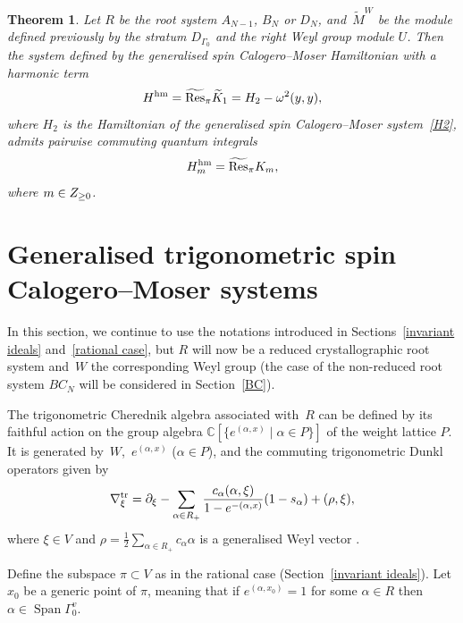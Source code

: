 \documentclass[12pt]{amsart}
\newcommand{\C}{\mathbb C}
\newcommand{\Z}{\mathbb Z}
\DeclareMathOperator{\Span}{Span}
\numberwithin{equation}{section}
\newtheorem{theorem}{Theorem}[section]
\theoremstyle{definition}
\begin{document}
\begin{theorem}
    Let $R$ be the root system $A_{N - 1}$, $B_N$ or $D_N$, and~$\widetilde{M}^W$ be the 
    module defined previously by the stratum $D_{\Gamma_0}$ and the right Weyl group 
    module $U$. Then the system defined by the generalised spin Calogero--Moser 
    Hamiltonian with a harmonic term 
    \begin{equation*}
        H^{\rm hm} =\widetilde{\mathrm{Res}}_{\pi}\widetilde{K}_1 = H_2 - \omega^2 (y , y) ,
    \end{equation*}
    where $H_2$ is the Hamiltonian of the generalised spin Calogero--Moser system~\eqref{H2}, admits pairwise commuting quantum integrals
    \begin{equation*}
        H_m^{\rm hm} = \widetilde{\mathrm{Res}}_{\pi} K_m,
    \end{equation*}
where $m\in \mathbb \Z_{\ge 0}$.
\end{theorem}




\section{Generalised trigonometric spin Calogero--Moser systems}\label{trig case}
In this section, we continue to use the notations introduced in Sections~\ref{invariant ideals} and~\ref{rational case}, but $R$ will now be a reduced crystallographic root system and~$W$ the corresponding Weyl group (the case of the non-reduced root system $BC_N$ will be considered in Section~\ref{BC}).

The trigonometric Cherednik algebra associated with~$R$ can be defined by its faithful action on the group algebra $\C[\{e^{(\alpha , x)} \mid \alpha \in P \}]$ of the weight lattice $P$. It is generated by~$W$,~$e^{(\alpha , x)}$ ($\alpha \in P$), and 
the commuting trigonometric Dunkl operators given by
\begin{equation}
    \label{trigDunkl}
    \nabla^{\rm tr}_{\xi} = \partial_{\xi} - \sum\limits_{\alpha \in R_+} \frac{c_{\alpha} (\alpha, \xi)}{1 - e^{-(\alpha,x)}}(1 - s_{\alpha}) + (\rho , \xi),
\end{equation}
where $\xi \in V$ and $\rho = \frac{1}{2}\sum_{\alpha \in R_+}c_{\alpha} \alpha$ is a generalised Weyl vector \cite{Ch1}. 
 
Define the subspace $\pi \subset V$ as in the rational case (Section~\ref{invariant ideals}). Let~$x_0$ be a generic point of $\pi$, meaning that if $e^{(\alpha, x_0)} = 1$ for some $\alpha \in R$ then $\alpha \in \Span \Gamma_0^v$.
\end{document}
